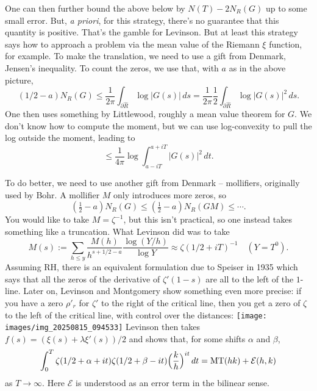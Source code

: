 \documentclass[reqno]{amsart} 
\begin{document}
\begin{itemize}
One can then further bound the above below by $N(T) - 2 N_R(G)$ up to some small error.  But, \emph{a priori}, for this strategy, there's no guarantee that this quantity is positive.  That's the gamble for Levinson.  But at least this strategy says how to approach a problem via the mean value of the Riemann $\xi$ function, for example.  To make the translation, we need to use a gift from Denmark, Jensen's inequality.  To count the zeros, we use that, with $a$ as in the above picture,
\begin{equation*}
  (1/2 - a) N_R(G) \leq \frac{1}{2 \pi} \int_{\partial \hat{R}} \log \lvert G(s) \rvert \, d s
  =
  \frac{1}{2 \pi} \frac{1}{2} \int_{\partial \hat{R}} \log \lvert G(s) \rvert^2 \, d s.
\end{equation*}
One then uses something by Littlewood, roughly a mean value theorem for $G$.  We don't know how to compute the moment, but we can use log-convexity to pull the log outside the moment, leading to
\begin{equation*}
  \leq \frac{1}{4 \pi} \log \int_{a - i T}^{a + i T} \lvert G(s) \rvert^2 \, d t.
\end{equation*}
\end{itemize}

To do better, we need to use another gift from Denmark -- mollifiers, originally used by Bohr.  A mollifier $M$ only introduces more zeros, so
\begin{equation*}
  (\tfrac{1}{2} - a) N_R(G) \leq(\tfrac{1}{2} - a) N_R(G M) \leq \dotsb.
\end{equation*}
You would like to take $M = \zeta^{-1}$, but this isn't practical, so one instead takes something like a truncation.  What Levinson did was to take
\begin{equation*}
  M(s) := \sum_{h \leq y} \frac{M(h)}{h^{s + 1/2 - a}} \frac{\log(Y / h)}{\log Y}
  \approx \zeta(1/2 + i T)^{-1} \quad(Y = T^0).
\end{equation*}
Assuming RH, there is an equivalent formulation due to Speiser in 1935 which says that all the zeros of the derivative of $\zeta '(1 - s)$ are all to the left of the $1$-line.  Later on, Levinson and Montgomery show something even more precise: if you have a zero $\rho '_r$ for $\zeta '$ to the right of the critical line, then you get a zero of $\zeta$ to the left of the critical line, with control over the distances:
\texttt{[image: images/img\_20250815\_094533]}
Levinson then takes $f(s) =(\xi(s) + \lambda \xi '(s)) / 2$ and shows that, for some shifts $\alpha$ and $\beta$,
\begin{equation*}
  \int_0^T \zeta(1/2 + \alpha + i t) \zeta(1/2 + \beta - i t) \Bigl( \frac{k}{h} \Bigr)^{i t}
  \, d t
  = \mathrm{MT}(h k) + \mathcal{E}(h, k)
\end{equation*}
as $T \rightarrow \infty $.  Here $\mathcal{E}$ is understood as an error term in the bilinear sense.
\end{document}
